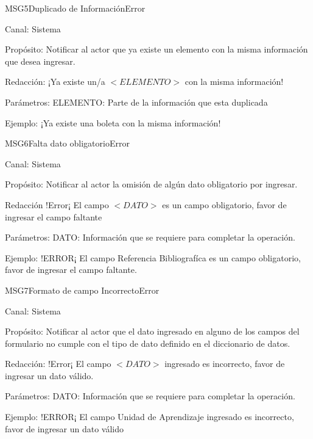 \begin{mensaje}{MSG5}{Duplicado de Información}{Error}
	\item[Canal:] Sistema
	\item[Propósito:] Notificar al actor que ya existe un elemento con la misma información que desea ingresar.
	\item[Redacción:] ¡Ya existe un/a $<ELEMENTO>$ con la misma información!
	\item[Parámetros:] ELEMENTO: Parte de la información que esta duplicada
	\item[Ejemplo:]¡Ya existe una boleta con la misma información!
	
\end{mensaje}

\begin{mensaje}{MSG6}{Falta dato obligatorio}{Error}
	\item[Canal:] Sistema
	\item[Propósito:] Notificar al actor la omisión de algún dato obligatorio por ingresar.
	\item[Redacción ] !Error¡ El campo $<DATO>$ es un campo obligatorio, favor de ingresar el campo faltante
	\item[Parámetros:] DATO: Información que se requiere para completar la operación.
	\item[Ejemplo:] !ERROR¡ El campo Referencia Bibliografíca es un campo obligatorio, favor de ingresar el campo faltante.
\end{mensaje}

\begin{mensaje}{MSG7}{Formato de campo Incorrecto}{Error }
	\item[Canal:] Sistema
	\item[Propósito:] Notificar al actor que el dato ingresado en alguno de los campos del formulario no cumple con el tipo de dato definido en el diccionario de datos.
	\item[Redacción:] !Error¡ El campo $<DATO>$ ingresado es incorrecto, favor de ingresar un dato válido.
	\item[Parámetros:] DATO: Información que se requiere para completar la operación.
	\item[Ejemplo:] !ERROR¡ El campo Unidad de Aprendizaje ingresado es incorrecto, favor de ingresar un dato válido
\end{mensaje}


